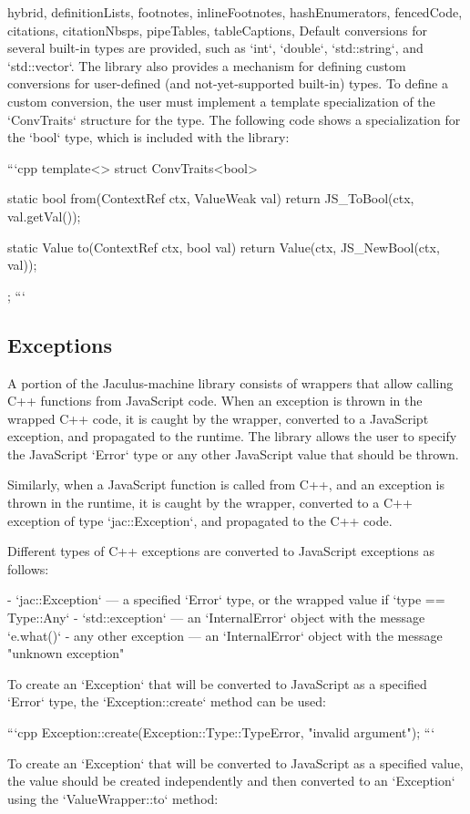\begin{markdown*}{%
  hybrid,
  definitionLists,
  footnotes,
  inlineFootnotes,
  hashEnumerators,
  fencedCode,
  citations,
  citationNbsps,
  pipeTables,
  tableCaptions,
}
Default conversions for several built-in types are provided, such as `int`, `double`, `std::string`, and `std::vector`. The library also provides a mechanism for defining custom conversions for user-defined (and not-yet-supported built-in) types. To define a custom conversion, the user must implement a template specialization of the `ConvTraits` structure for the type. The following code shows a specialization for the `bool` type, which is included with the library:

```cpp
template<>
struct ConvTraits<bool> {
  static bool from(ContextRef ctx, ValueWeak val) {
    return JS_ToBool(ctx, val.getVal());
  }

  static Value to(ContextRef ctx, bool val) {
    return Value(ctx, JS_NewBool(ctx, val));
  }
};
```

\subsection{Exceptions}

A portion of the Jaculus-machine library consists of wrappers that allow calling C++ functions from JavaScript code. When an exception is thrown in the wrapped C++ code, it is caught by the wrapper, converted to a JavaScript exception, and propagated to the runtime. The library allows the user to specify the JavaScript `Error` type or any other JavaScript value that should be thrown.

Similarly, when a JavaScript function is called from C++, and an exception is thrown in the runtime, it is caught by the wrapper, converted to a C++ exception of type `jac::Exception`, and propagated to the C++ code.

Different types of C++ exceptions are converted to JavaScript exceptions as follows:

  - `jac::Exception` --- a specified `Error` type, or the wrapped value if `type == Type::Any`
  - `std::exception` --- an `InternalError` object with the message `e.what()`
  - any other exception --- an `InternalError` object with the message "unknown exception"

To create an `Exception` that will be converted to JavaScript as a specified `Error` type, the `Exception::create` method can be used:

```cpp
Exception::create(Exception::Type::TypeError, "invalid argument");
```

To create an `Exception` that will be converted to JavaScript as a specified value, the value should be created independently and then converted to an `Exception` using the `ValueWrapper::to` method:


\end{markdown*}
